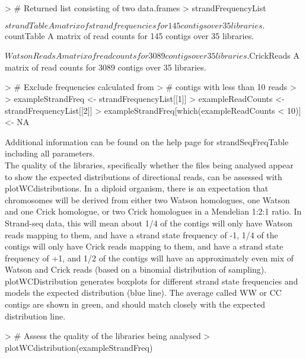 \documentclass{article}
\begin{document}
\begin{Schunk}
\begin{Sinput}
> # Returned list consisting of two data.frames
> strandFrequencyList
\end{Sinput}
\begin{Soutput}
$strandTable
A matrix of strand frequencies for  145  contigs over  35  libraries.

$countTable
A matrix of read counts for  145  contigs over  35  libraries.

$WatsonReads
A matrix of read counts for  3089  contigs over  35  libraries.

$CrickReads
A matrix of read counts for  3089  contigs over  35  libraries.
\end{Soutput}
\begin{Sinput}
> # Exclude frequencies calculated from
> # contigs with less than 10 reads
> 
> exampleStrandFreq <- strandFrequencyList[[1]]
> exampleReadCounts <- strandFrequencyList[[2]]
> exampleStrandFreq[which(exampleReadCounts < 10)] <- NA 
\end{Sinput}
\end{Schunk}

Additional information can be found on the help page for strandSeqFreqTable including all parameters.\\

The quality of the libraries, specifically whether the files being analysed appear to show the expected distributions of directional reads, can be assessed with plotWCdistributions.  In a diploid organism, there is an expectation that chromosomes will be derived from either two Watson homologues, one Watson and one Crick homologue, or two Crick homologues in a Mendelian 1:2:1 ratio.  In Strand-seq data, this will mean about 1/4 of the contigs will only have Watson reads mapping to them, and have a strand state frequency of -1, 1/4 of the contigs will only have Crick reads mapping to them, and have a strand state frequency of +1, and 1/2 of the contigs will have an approximately even mix of Watson and Crick reads (based on a binomial distribution of sampling).  plotWCDistribution generates boxplots for different strand state frequencies and models the expected distribution (blue line). The average called WW or CC contigs are shown in green, and should match closely with the expected distribution line.

\begin{Schunk}
\begin{Sinput}
> # Assess the quality of the libraries being analysed
> plotWCdistribution(exampleStrandFreq)
\end{Sinput}
\end{Schunk}
\end{document}
